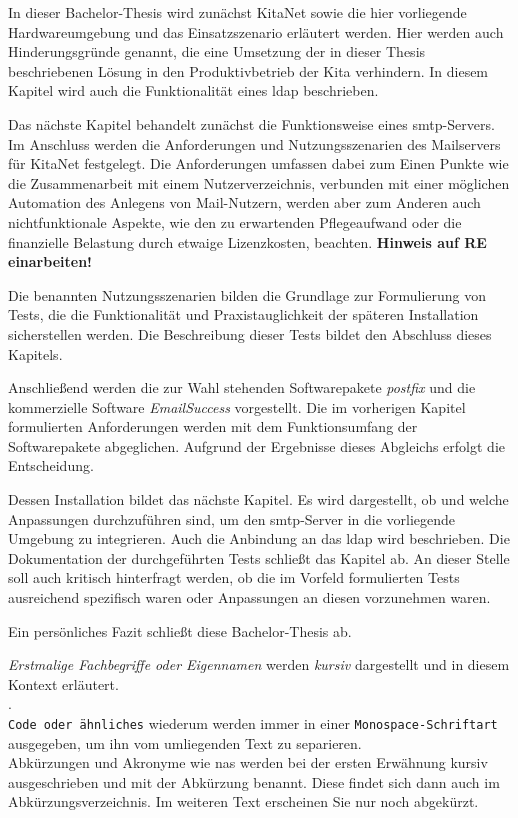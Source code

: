 In dieser Bachelor-Thesis wird zunächst KitaNet sowie die hier vorliegende Hardwareumgebung und das Einsatzszenario erläutert werden. Hier werden auch Hinderungsgründe genannt, die eine Umsetzung der in dieser Thesis beschriebenen Lösung in den Produktivbetrieb der Kita verhindern. In diesem Kapitel wird auch die Funktionalität eines \ac{ldap} beschrieben.

Das nächste Kapitel behandelt zunächst die Funktionsweise eines \ac{smtp}-Servers. Im Anschluss werden die Anforderungen und Nutzungsszenarien des Mailservers für KitaNet festgelegt. Die Anforderungen umfassen dabei zum Einen Punkte wie die Zusammenarbeit mit einem Nutzerverzeichnis, verbunden mit einer möglichen Automation des Anlegens von Mail-Nutzern, werden aber zum Anderen auch nichtfunktionale Aspekte, wie den zu erwartenden Pflegeaufwand oder die finanzielle Belastung durch etwaige Lizenzkosten, beachten. \textbf{Hinweis auf RE einarbeiten!}

Die benannten Nutzungsszenarien bilden die Grundlage zur Formulierung von Tests, die die Funktionalität und Praxistauglichkeit der späteren Installation sicherstellen werden. Die Beschreibung dieser Tests bildet den Abschluss  dieses Kapitels.

Anschließend werden die zur Wahl stehenden Softwarepakete \textit{postfix} und die kommerzielle Software \textit{EmailSuccess} vorgestellt. Die im vorherigen Kapitel formulierten Anforderungen werden mit dem Funktionsumfang der Softwarepakete abgeglichen. Aufgrund der Ergebnisse dieses Abgleichs erfolgt die Entscheidung. 

Dessen Installation bildet das nächste Kapitel. Es wird dargestellt, ob und welche Anpassungen durchzuführen sind, um den \ac{smtp}-Server in die vorliegende Umgebung zu integrieren. Auch die Anbindung an das \ac{ldap} wird beschrieben.
Die Dokumentation der durchgeführten Tests schließt das Kapitel ab. An dieser Stelle soll auch kritisch hinterfragt werden, ob die im Vorfeld formulierten Tests ausreichend spezifisch waren oder Anpassungen an diesen vorzunehmen waren.

Ein persönliches Fazit schließt diese Bachelor-Thesis ab.

\textit{Erstmalige Fachbegriffe oder Eigennamen } werden \textit{kursiv} dargestellt und in diesem Kontext erläutert.  \\ . \\ \verb+Code oder ähnliches+ wiederum werden immer in einer \verb+Monospace-Schriftart+ ausgegeben, um ihn vom umliegenden Text zu separieren. \\ Abkürzungen und Akronyme wie \zb \ac{nas} werden bei der ersten Erwähnung kursiv ausgeschrieben und mit der Abkürzung benannt. Diese findet sich dann auch im Abkürzungsverzeichnis. Im weiteren Text erscheinen Sie nur noch abgekürzt. 

